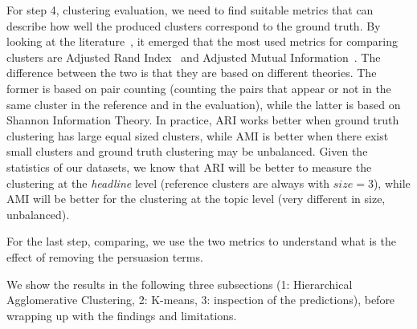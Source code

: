 
For step 4, clustering evaluation, we need to find suitable metrics that can describe how well the produced clusters correspond to the ground truth.
By looking at the literature~\citep{romano2016adjusting}, it emerged that the most used metrics for comparing clusters are Adjusted Rand Index~\citep{rand1971objective} and Adjusted Mutual Information~\citep{vinh2009information}.
The difference between the two is that they are based on different theories. The former is based on pair counting (counting the pairs that appear or not in the same cluster in the reference and in the evaluation), while the latter is based on Shannon Information Theory. In practice, ARI works better when ground truth clustering has large equal sized clusters, while AMI is better when there exist small clusters and ground truth clustering may be unbalanced.
Given the statistics of our datasets, we know that ARI will be better to measure the clustering at the \emph{headline} level (reference clusters are always with $size=3$), while AMI will be better for the clustering at the topic level (very different in size, unbalanced).






For the last step, comparing, we use the two metrics to understand what is the effect of removing the persuasion terms.



We show the results in the following three subsections (1: Hierarchical Agglomerative Clustering, 2: K-means, 3: inspection of the predictions), before wrapping up with the findings and limitations. %


